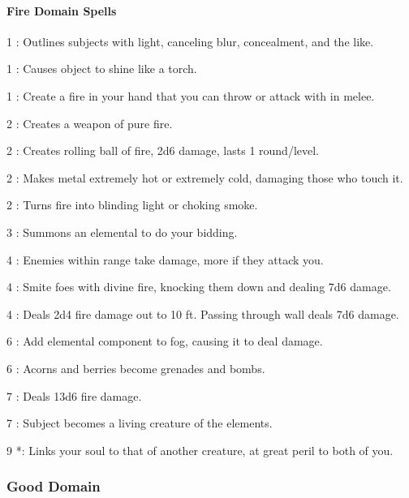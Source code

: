 \paragraph{Fire Domain Spells}
\begin{list}{}{\leftmargin=1em}
\item[1] : Outlines subjects with light, canceling blur, concealment, and the like.
\item[1] : Causes object to shine like a torch.
\item[1] : Create a fire in your hand that you can throw or attack with in melee.
\item[2] : Creates a weapon of pure fire.
\item[2] : Creates rolling ball of fire, 2d6 damage, lasts 1 round/level.
\item[2] : Makes metal extremely hot or extremely cold, damaging those who touch it.
\item[2] : Turns fire into blinding light or choking smoke.
\item[3] : Summons an elemental to do your bidding.
\item[4] : Enemies within range take damage, more if they attack you.
\item[4] : Smite foes with divine fire, knocking them down and dealing 7d6 damage.
\item[4] : Deals 2d4 fire damage out to 10 ft. Passing through wall deals 7d6 damage.
\item[6] : Add elemental component to fog, causing it to deal damage.
\item[6] : Acorns and berries become grenades and bombs.
\item[7] : Deals 13d6 fire damage.
\item[7] : Subject becomes a living creature of the elements.
\item[9] *: Links your soul to that of another creature, at great peril to both of you.
\end{list}
\subsubsection{Good Domain}
